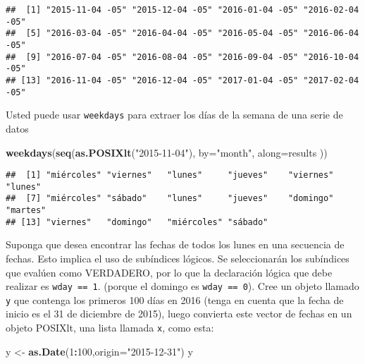 \documentclass[]{article}
\newenvironment{Shaded}{\begin{snugshade}}{\end{snugshade}}
\newcommand{\KeywordTok}[1]{\textcolor[rgb]{0.13,0.29,0.53}{\textbf{#1}}}
\newcommand{\DataTypeTok}[1]{\textcolor[rgb]{0.13,0.29,0.53}{#1}}
\newcommand{\DecValTok}[1]{\textcolor[rgb]{0.00,0.00,0.81}{#1}}
\newcommand{\StringTok}[1]{\textcolor[rgb]{0.31,0.60,0.02}{#1}}
\newcommand{\OperatorTok}[1]{\textcolor[rgb]{0.81,0.36,0.00}{\textbf{#1}}}
\newcommand{\NormalTok}[1]{#1}
\begin{document}
\begin{verbatim}
##  [1] "2015-11-04 -05" "2015-12-04 -05" "2016-01-04 -05" "2016-02-04 -05"
##  [5] "2016-03-04 -05" "2016-04-04 -05" "2016-05-04 -05" "2016-06-04 -05"
##  [9] "2016-07-04 -05" "2016-08-04 -05" "2016-09-04 -05" "2016-10-04 -05"
## [13] "2016-11-04 -05" "2016-12-04 -05" "2017-01-04 -05" "2017-02-04 -05"
\end{verbatim}

Usted puede usar \texttt{weekdays} para extraer los días de la semana de
una serie de datos

\begin{Shaded}
\begin{Highlighting}[]
\KeywordTok{weekdays}\NormalTok{(}\KeywordTok{seq}\NormalTok{(}\KeywordTok{as.POSIXlt}\NormalTok{(}\StringTok{"2015-11-04"}\NormalTok{), }\DataTypeTok{by=}\StringTok{"month"}\NormalTok{, }\DataTypeTok{along=}\NormalTok{results ))}
\end{Highlighting}
\end{Shaded}

\begin{verbatim}
##  [1] "miércoles" "viernes"   "lunes"     "jueves"    "viernes"   "lunes"    
##  [7] "miércoles" "sábado"    "lunes"     "jueves"    "domingo"   "martes"   
## [13] "viernes"   "domingo"   "miércoles" "sábado"
\end{verbatim}

Suponga que desea encontrar las fechas de todos los lunes en una
secuencia de fechas. Esto implica el uso de subíndices lógicos. Se
seleccionarán los subíndices que evalúen como VERDADERO, por lo que la
declaración lógica que debe realizar es \texttt{wday\ ==\ 1}. (porque el
domingo es \texttt{wday\ ==\ 0}). Cree un objeto llamado \texttt{y} que
contenga los primeros 100 días en 2016 (tenga en cuenta que la fecha de
inicio es el 31 de diciembre de 2015), luego convierta este vector de
fechas en un objeto POSIXlt, una lista llamada \texttt{x}, como esta:

\begin{Shaded}
\begin{Highlighting}[]
\NormalTok{y <-}\StringTok{ }\KeywordTok{as.Date}\NormalTok{(}\DecValTok{1}\OperatorTok{:}\DecValTok{100}\NormalTok{,}\DataTypeTok{origin=}\StringTok{"2015-12-31"}\NormalTok{)}
\NormalTok{y}
\end{Highlighting}
\end{Shaded}
\end{document}
